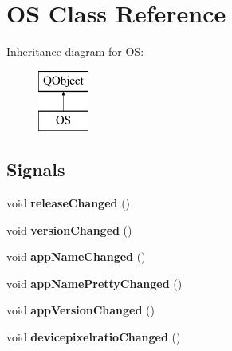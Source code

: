 \hypertarget{classOS}{}\section{OS Class Reference}
\label{classOS}
Inheritance diagram for OS\+:\begin{figure}[H]
\begin{center}
\leavevmode
\includegraphics[height=2.000000cm]{classOS}
\end{center}
\end{figure}
\subsection*{Signals}
\begin{DoxyCompactItemize}
\item 
\mbox{\label{classOS_a58369b88b24b1701b020bd0971d99c03}} 
void {\bfseries release\+Changed} ()
\item 
\mbox{\label{classOS_a2bb282eb19c9eaa0c787dabc434a9fca}} 
void {\bfseries version\+Changed} ()
\item 
\mbox{\label{classOS_ad55c57724a077d427b89ede6e1f8b235}} 
void {\bfseries app\+Name\+Changed} ()
\item 
\mbox{\label{classOS_a21d29e6b9eef2bccc62db0d29d56b4c5}} 
void {\bfseries app\+Name\+Pretty\+Changed} ()
\item 
\mbox{\label{classOS_a39f7a3688e008fde1008e6b7e5b5ebcb}} 
void {\bfseries app\+Version\+Changed} ()
\item 
\mbox{\label{classOS_a0ecbe56e6ec612ba6f78af5086505751}} 
void {\bfseries devicepixelratio\+Changed} ()
\end{DoxyCompactItemize}
